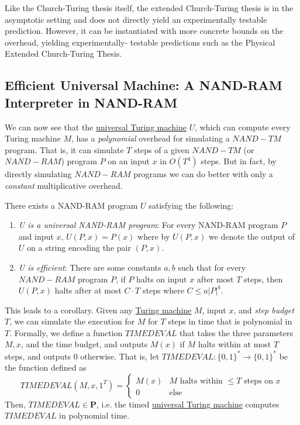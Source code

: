   Like the Church-Turing thesis itself, the extended Church-Turing thesis is in the asymptotic setting and does not directly yield an experimentally testable prediction. However, it can be instantiated with more concrete bounds on the overhead, yielding experimentally- testable predictions such as the Physical Extended Church-Turing Thesis. 
   
\subsection{Efficient Universal Machine: A NAND-RAM Interpreter in NAND-RAM}

  We can now see that the \hyperref[thm:universal-turing-machine]{universal Turing machine} $U$, which can compute every Turing machine $M$, has a \textit{polynomial} overhead for simulating a $NAND-TM$ program. That is, it can simulate $T$ steps of a given $NAND-TM$ (or $NAND-RAM$) program $P$ on an input $x$ in $O(T^4)$ steps. But in fact, by directly simulating $NAND-RAM$ programs we can do better with only a \textit{constant} multiplicative overhead. 

  \begin{theorem}
    \label{thm:efficient-universality-of-nand-ram}
  There exists a NAND-RAM program $U$ satisfying the following: 
  \begin{enumerate}
      \item \textit{U is a universal NAND-RAM program}: For every NAND-RAM program $P$ and input $x$, $U(P, x) = P(x)$ where by $U(P, x)$ we denote the output of $U$ on a string encoding the pair $(P, x)$. 
      \item \textit{U is efficient}: There are some constants $a, b$ such that for every $NAND-RAM$ program $P$, if $P$ halts on input $x$ after most $T$ steps, then $U(P, x)$ halts after at most $C \cdot T$ steps where $C \leq a |P|^b$. 
  \end{enumerate}
  \end{theorem}

  This leads to a corollary. Given any \hyperref[def:turing-machine]{Turing machine} $M$, input $x$, and \textit{step budget} $T$, we can simulate the execution for $M$ for $T$ steps in time that is polynomial in $T$. Formally, we define a function $TIMEDEVAL$ that takes the three parameters $M, x$, and the time budget, and outputs $M(x)$ if $M$ halts within at most $T$ steps, and outputs $0$ otherwise. That is, let $TIMEDEVAL: \{0,1\}^* \to \{0,1\}^*$ be the function defined as 
  \begin{equation}
    TIMEDEVAL (M, x, 1^T) = \begin{cases}
      M(x) & M \text{ halts within } \leq T \text{ steps on } x \\
      0 & \text{else}
      \end{cases}
  \end{equation}
  Then, $TIMEDEVAL \in \mathbf{P}$, i.e. the timed \hyperref[thm:universal-turing-machine]{universal Turing machine} computes $TIMEDEVAL$ in polynomial time. 

